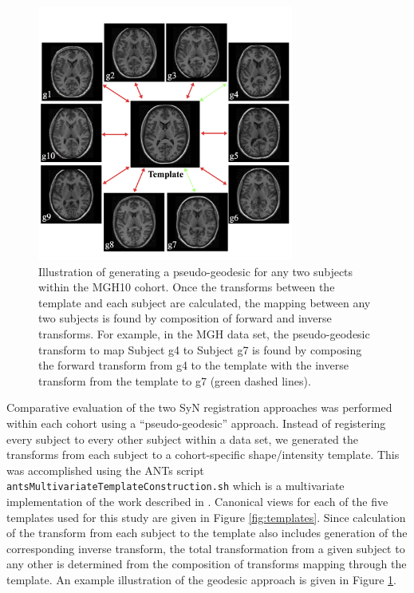 \documentclass{frontiersSCNS}
\begin{document}
\begin{figure}[htb]
  \centering
  \includegraphics[width=0.75\textwidth]{pseudo_geodesic.jpg}
  \caption{Illustration of generating a pseudo-geodesic for any two subjects
  within the MGH10 cohort.  Once the transforms between the
  template and each subject are calculated, the mapping between any two
  subjects is found by composition of forward and inverse transforms.  For
  example, in the MGH data set, the pseudo-geodesic transform to
  map Subject g4 to Subject g7 is found by composing the forward
  transform from g4 to the template with the inverse transform from the
  template to g7 (green dashed lines).
  }
  \label{fig:pseudo_geodesic}
\end{figure}

Comparative evaluation of the two SyN registration approaches was performed 
within each cohort using a ``pseudo-geodesic'' approach.  Instead of
registering every subject to every other subject within a data set,
we generated the transforms from each subject to a cohort-specific
shape/intensity template.  This was accomplished using the ANTs script {\tt antsMultivariateTemplateConstruction.sh}
which is a multivariate implementation of the work described in
\cite{avants2010}. Canonical views for each of the five templates
used for this study are given in Figure \ref{fig:templates}.  
Since calculation of the transform from each subject to the template also
includes generation of the corresponding inverse transform, the total
transformation from a given subject to any other is determined from the composition
of transforms mapping through the template.  An example illustration of the
geodesic approach is given in Figure \ref{fig:pseudo_geodesic}.
\end{document}
